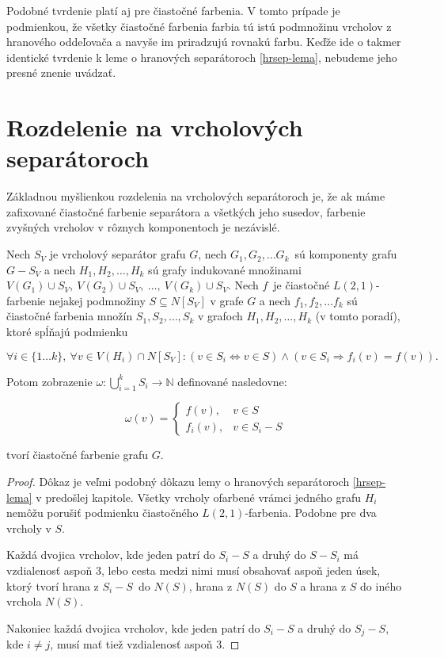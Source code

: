 Podobné tvrdenie platí aj pre čiastočné farbenia. V tomto prípade je podmienkou, že všetky čiastočné
farbenia farbia tú istú podmnožinu vrcholov z hranového oddeľovača a navyše im priradzujú rovnakú farbu.
Keďže ide o takmer identické tvrdenie k leme o hranových separátoroch \ref{hrsep-lema}, nebudeme
jeho presné znenie uvádzať.

\section{Rozdelenie na vrcholových separátoroch}

Základnou myšlienkou rozdelenia na vrcholových separátoroch je, že ak máme zafixované čiastočné
farbenie separátora a všetkých jeho susedov, farbenie zvyšných vrcholov v rôznych komponentoch
je nezávislé.

\begin{lema}
    Nech $S_V$ je vrcholový separátor grafu $G$, nech $G_1, G_2, \ldots G_k$ sú komponenty
    grafu $G - S_V$ a nech $H_1, H_2, \ldots, H_k$ sú grafy indukované množinami $V(G_1) \cup S_V,\ V(G_2) \cup S_V,\ \ldots,\ V(G_k) \cup S_V$.
    Nech $f$ je čiastočné $L(2,1)$-farbenie nejakej podmnožiny $S \subseteq N[S_V]$ v grafe $G$ a nech $f_1, f_2, \ldots f_k$
    sú čiastočné farbenia množín $S_1, S_2, \ldots, S_k$ v grafoch $H_1, H_2, \ldots, H_k$ (v tomto poradí), ktoré spĺňajú podmienku

    $$ \forall i \in \{1 \ldots k\},\ \forall v \in V(H_i) \cap N[S_V]: (v \in S_i \Leftrightarrow v \in S) \wedge (v \in S_i \Rightarrow f_i(v) = f(v)).$$

    Potom zobrazenie $\omega: \bigcup \limits_{i=1}^k S_i \to \mathbb{N}$ definované nasledovne:

    \[ \omega(v) =
    \begin{cases}
        f(v), & v \in S \\
        f_i(v), & v \in S_i - S
    \end{cases}
    \]

    tvorí čiastočné farbenie grafu $G$.
\end{lema}

\begin{proof}
    Dôkaz je veľmi podobný dôkazu lemy o hranových separátoroch \ref{hrsep-lema} v predošlej kapitole. Všetky
    vrcholy ofarbené vrámci jedného grafu $H_i$ nemôžu porušiť podmienku čiastočného $L(2,1)$-farbenia. Podobne
    pre dva vrcholy v $S$.
    
    Každá dvojica vrcholov, kde jeden patrí do $S_i - S$ a druhý do $S - S_i$ má vzdialenosť
    aspoň $3$, lebo cesta medzi nimi musí obsahovať aspoň jeden úsek, ktorý tvorí hrana z $S_i - S$ do $N(S)$, hrana
    z $N(S)$ do $S$ a hrana z $S$ do iného vrchola $N(S)$.

    Nakoniec každá dvojica vrcholov, kde jeden patrí do $S_i - S$ a druhý do $S_j - S$, kde $i \neq j$, musí mať tiež
    vzdialenosť aspoň $3$.
\end{proof}

